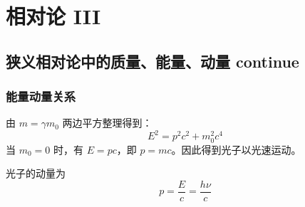 \section{相对论 III}

\subsection{狭义相对论中的质量、能量、动量 continue}

\subsubsection{能量动量关系}

由 $m = \gamma m_0$ 两边平方整理得到：
$$
E^2 = p^2 c^2 + m_0^2 c^4
$$
当 $m_0 = 0$ 时，有 $E = p c$，即 $p = m c$。因此得到光子以光速运动。

光子的动量为
$$
p = \frac{E}{c} = \frac{h \nu}{c}
$$
